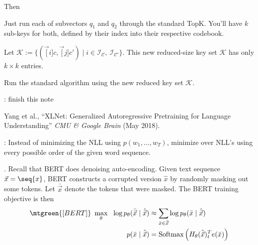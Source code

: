 \documentclass[11pt]{article}
\begin{document}
Then\textellipsis
\begin{compactenum}
	\item Just run each of subvectors $q_1$ and $q_2$ through the standard TopK. You'll have $k$ sub-keys for both, defined by their index into their respective codebook. 
	
	\item Let $\mathcal K := \{ (\vec[i]{c}, \vec[j]{c}') \mid i \in \mathcal I_{\mathcal C}, ~ \mathcal I_{\mathcal C'}  \}$. This new reduced-size key set $\mathcal K$ has only $k \times k$ entries.
	
	\item Run the standard algorithm using the new reduced key set $\mathcal K$. 
\end{compactenum}

: finish this note








\vspace{-1em}
{\footnotesize Yang et al., ``XLNet: Generalized Autoregressive Pretraining for Language Understanding'' \textit{CMU \& Google Brain} (May 2018).}

: Instead of minimizing the NLL using $p(w_1, \ldots, w_T)$, minimize over NLL's using every possible order of the given word sequence. 

. Recall that BERT does denoising auto-encoding. Given text sequence $\vec x = \seq{x}$, BERT constructs a corrupted version $\hat x$ by randomly masking out some tokens. Let $\bar{\vec x}$ denote the tokens that were masked. The BERT training objective is then
\begin{align}
\mtgreen{[BERT]} ~ \max_{\theta} ~~
\log p_{\theta} (\bar{\vec x} \mid \hat{\vec x})
&\approx 
\sum_{\bar x \in \bar{\vec x}} \log p_{\theta} (\bar x \mid \hat{\vec x}) \\
p(\bar x \mid \hat{\vec x})
&=  \text{Softmax}\left(  H_{\theta}(\hat{\vec x})_t^T e(\bar x) \right)
\end{align}
\end{document}
